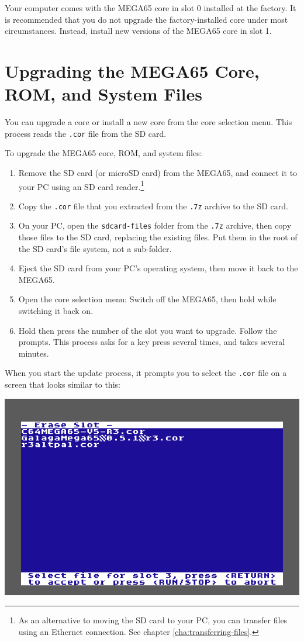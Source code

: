 Your computer comes with the MEGA65 core in slot 0 installed at the factory. It is recommended that you do not upgrade the factory-installed core under most circumstances. Instead, install new versions of the MEGA65 core in slot 1.

\section{Upgrading the MEGA65 Core, ROM, and System Files}

You can upgrade a core or install a new core from the core selection menu. This process reads the {\tt .cor} file from the SD card.

To upgrade the MEGA65 core, ROM, and system files:

\begin{enumerate}
  \item Remove the SD card (or microSD card) from the MEGA65, and connect it to your PC using an SD card reader.\footnote{As an alternative to moving the SD card to your PC, you can transfer files using an Ethernet connection. See chapter \vref{cha:transferring-files}.}
  \item Copy the {\tt .cor} file that you extracted from the {\tt .7z} archive to the SD card.
  \item On your PC, open the {\tt sdcard-files} folder from the {\tt .7z} archive, then copy those files to the SD card, replacing the existing files. Put them in the root of the SD card's file system, not a sub-folder.
  \item Eject the SD card from your PC's operating system, then move it back to the MEGA65.
  \item Open the core selection menu: Switch off the MEGA65, then hold  while switching it back on.
  \item Hold  then press the number of the slot you want to upgrade. Follow the prompts. This process asks for a key press several times, and takes several minutes.
\end{enumerate}

When you start the update process, it prompts you to select the {\tt .cor} file on a screen that looks similar to this:

\begin{center}
  \includegraphics[width=0.7\linewidth]{images/ss-flashmenu-selectcore.png}
\end{center}

